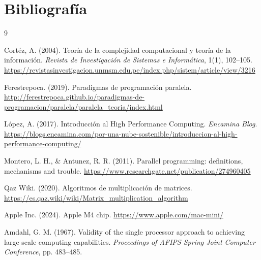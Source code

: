 \documentclass{article}
\begin{document}
\newpage
\section{Bibliografía}

\begin{thebibliography}{9}

    Cortéz, A. (2004). Teoría de la complejidad computacional y teoría de la información.
    \textit{Revista de Investigación de Sistemas e Informática}, 1(1), 102--105.
    \url{https://revistasinvestigacion.unmsm.edu.pe/index.php/sistem/article/view/3216}

    Ferestrepoca. (2019). Paradigmas de programación paralela.
    \url{http://ferestrepoca.github.io/paradigmas-de-programacion/paralela/paralela_teoria/index.html}

    López, A. (2017). Introducción al High Performance Computing. \textit{Encamina Blog}.
    \url{https://blogs.encamina.com/por-una-nube-sostenible/introduccion-al-high-performance-computing/}

    Montero, L. H., \& Antunez, R. R. (2011). Parallel programming: definitions, mechanisms and trouble.
    \url{https://www.researchgate.net/publication/274960405}

    Qaz Wiki. (2020). Algoritmos de multiplicación de matrices.
    \url{https://es.qaz.wiki/wiki/Matrix_multiplication_algorithm}

    Apple Inc. (2024). Apple M4 chip. \url{https://www.apple.com/mac-mini/}

    Amdahl, G. M. (1967). Validity of the single processor approach to achieving large scale computing capabilities.
    \textit{Proceedings of AFIPS Spring Joint Computer Conference}, pp. 483--485.

\end{thebibliography}
\end{document}
